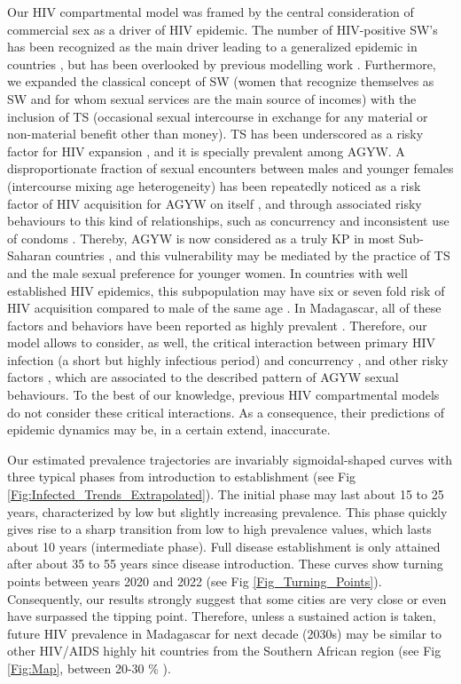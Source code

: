 \documentclass[preprint,12pt]{elsarticle}
\begin{document}
Our HIV compartmental model was framed by the central consideration of commercial sex as a driver of HIV epidemic. The number of HIV-positive SW's has been recognized as the main driver leading to a generalized epidemic in countries \cite{Talbott2007}, but has been overlooked by previous modelling work \cite{Kim2014,Omondi2018,Mukandarive2007}. Furthermore, we expanded the classical concept of SW (women that recognize themselves as SW and for whom sexual services are the main source of incomes) with the inclusion of TS (occasional sexual intercourse in exchange for any material or non-material benefit other than money). TS has been underscored as a risky factor for HIV expansion \cite{Wamoyi2016}, and it is specially prevalent among AGYW. A disproportionate fraction of sexual encounters between males and younger females (intercourse mixing age heterogeneity)  has been repeatedly noticed as a risk factor of HIV acquisition for AGYW on itself \cite{Stoner2020}  , and through associated risky behaviours to this kind of relationships, such as concurrency and inconsistent use of condoms \cite{Anderson1992,Maughan-Brown2016,George2019a,Evans2017}. Thereby, AGYW is now considered as a truly KP in most Sub-Saharan countries \cite{Dellar2016}, and this vulnerability may be mediated by the practice of TS and the male sexual preference for younger women. In countries with well established HIV epidemics, this subpopulation may have six or seven fold risk of HIV acquisition compared to male of the same age  \cite{Leclerc2008,Dellar2016}. In Madagascar, all of these factors and behaviors have been reported as highly prevalent \cite{Raberahona2020}. Therefore, our model allows to consider, as well, the critical interaction between primary HIV infection (a short but highly infectious period) and concurrency \cite{Eaton2011,Mah2011,Kim2010,Goodreau2012}, and other risky factors \cite{Hollingsworth2008}, which are associated to the described pattern of AGYW sexual behaviours. To the best of our knowledge, previous HIV compartmental models do not consider these critical interactions. As a consequence, their predictions of epidemic dynamics may be, in a certain extend, inaccurate.
\smallskip

Our estimated prevalence trajectories are invariably sigmoidal-shaped curves with three typical phases from introduction to establishment (see Fig \ref{Fig:Infected_Trends_Extrapolated}). The initial phase may last about 15 to 25 years, characterized by low but slightly increasing prevalence. This phase quickly gives rise to a sharp transition from low to high prevalence values, which lasts about 10 years (intermediate phase). Full disease establishment is only attained after about 35 to 55 years since disease introduction. These curves show turning points between years 2020 and 2022 (see Fig \ref{Fig_Turning_Points}). Consequently, our results strongly suggest that some cities are very close or even have surpassed the tipping point. Therefore, unless a sustained action is taken, future HIV prevalence in Madagascar for next decade (2030s) may be similar to other HIV/AIDS highly hit countries from the Southern African region (see Fig \ref{Fig:Map}, between 20-30 \% \cite{Epstein2011}). 
\smallskip
\end{document}
